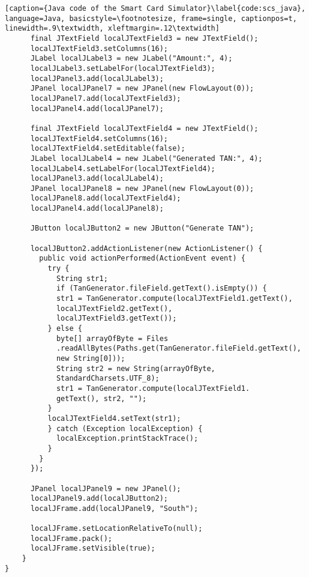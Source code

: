 \begin{lstlisting}[caption={Java code of the Smart Card Simulator}\label{code:scs_java}, language=Java, basicstyle=\footnotesize, frame=single, captionpos=t, linewidth=.9\textwidth, xleftmargin=.12\textwidth]
	  final JTextField localJTextField3 = new JTextField();
	  localJTextField3.setColumns(16);
	  JLabel localJLabel3 = new JLabel("Amount:", 4);
	  localJLabel3.setLabelFor(localJTextField3);
	  localJPanel3.add(localJLabel3);
	  JPanel localJPanel7 = new JPanel(new FlowLayout(0));
	  localJPanel7.add(localJTextField3);
	  localJPanel4.add(localJPanel7);

	  final JTextField localJTextField4 = new JTextField();
	  localJTextField4.setColumns(16);
	  localJTextField4.setEditable(false);
	  JLabel localJLabel4 = new JLabel("Generated TAN:", 4);
	  localJLabel4.setLabelFor(localJTextField4);
	  localJPanel3.add(localJLabel4);
	  JPanel localJPanel8 = new JPanel(new FlowLayout(0));
	  localJPanel8.add(localJTextField4);
	  localJPanel4.add(localJPanel8);

	  JButton localJButton2 = new JButton("Generate TAN");

	  localJButton2.addActionListener(new ActionListener() {
		public void actionPerformed(ActionEvent event) {
	   	  try {
			String str1;
		    if (TanGenerator.fileField.getText().isEmpty()) {
			str1 = TanGenerator.compute(localJTextField1.getText(),
			localJTextField2.getText(),
			localJTextField3.getText());
		  } else {
		    byte[] arrayOfByte = Files
		    .readAllBytes(Paths.get(TanGenerator.fileField.getText(),
		    new String[0]));
		    String str2 = new String(arrayOfByte,
		    StandardCharsets.UTF_8);
		    str1 = TanGenerator.compute(localJTextField1.
		    getText(), str2, "");
		  }
		  localJTextField4.setText(str1);
		  } catch (Exception localException) {
			localException.printStackTrace();
		  }
		}
	  });

	  JPanel localJPanel9 = new JPanel();
	  localJPanel9.add(localJButton2);
	  localJFrame.add(localJPanel9, "South");

	  localJFrame.setLocationRelativeTo(null);
	  localJFrame.pack();
	  localJFrame.setVisible(true);
	}
}
\end{lstlisting}